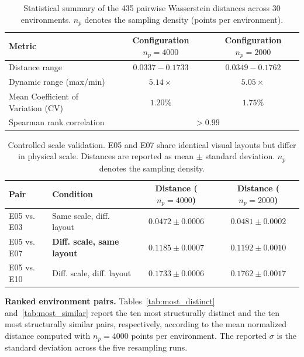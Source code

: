 \documentclass[robotics,article,submit,pdftex,moreauthors]{Definitions/mdpi}
\begin{document}
\begin{table}[htbp]
\centering
\caption{Statistical summary of the 435 pairwise Wasserstein distances across 30 environments. \(n_p\) denotes the sampling density (points per environment).}
\label{tab:metric_validation_stats}
\begin{tabular}{lcc}
\toprule
\textbf{Metric} & \textbf{Configuration \(n_p=4000\)} & \textbf{Configuration \(n_p=2000\)} \\
\midrule
Distance range & \(0.0337 - 0.1733\) & \(0.0349 - 0.1762\) \\
Dynamic range (max/min) & \(5.14\times\) & \(5.05\times\) \\
Mean Coefficient of Variation (CV) & \(1.20\%\) & \(1.75\%\) \\
Spearman rank correlation & \multicolumn{2}{c}{\(> 0.99\)} \\
\bottomrule
\end{tabular}
\end{table}
\begin{table}[htbp]
\centering
\caption{Controlled scale validation. E05 and E07 share identical visual layouts but differ in physical scale. Distances are reported as mean \(\pm\) standard deviation. \(n_p\) denotes the sampling density.}
\label{tab:scale_control}

\begin{tabular}{llcc}
\toprule
\textbf{Pair} & \textbf{Condition} & \textbf{Distance (\(n_p=4000\))} & \textbf{Distance (\(n_p=2000\))} \\
\midrule
E05 vs. E03 & Same scale, diff. layout & \(0.0472 \pm 0.0006\) & \(0.0481 \pm 0.0002\) \\
E05 vs. E07 & \textbf{Diff. scale, same layout} & \(\mathbf{0.1185 \pm 0.0007}\) & \(\mathbf{0.1192 \pm 0.0010}\) \\
E05 vs. E10 & Diff. scale, diff. layout & \(0.1733 \pm 0.0006\) & \(0.1762 \pm 0.0017\) \\
\bottomrule
\end{tabular}
\end{table}

\textbf{Ranked environment pairs.} Tables~\ref{tab:most_distinct} and~\ref{tab:most_similar} report the ten most structurally distinct and the ten most structurally similar pairs, respectively, according to the mean normalized distance computed with \(n_p=4000\) points per environment. The reported \(\sigma\) is the standard deviation across the five resampling runs.


\end{document}
